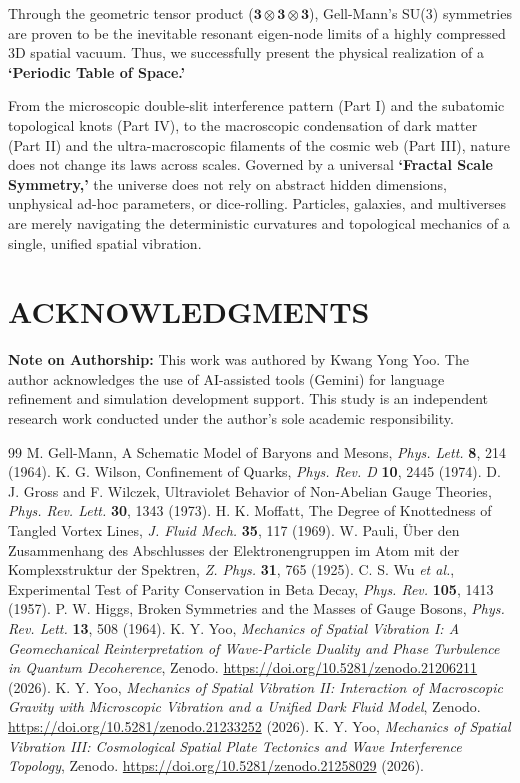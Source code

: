 \documentclass[reprint,amsmath,amssymb,aps,prd]{revtex4-2}
\begin{document}
Through the geometric tensor product ($\mathbf{3} \otimes \mathbf{3} \otimes \mathbf{3}$), Gell-Mann's SU(3) symmetries \cite{GellMann1964} are proven to be the inevitable resonant eigen-node limits of a highly compressed 3D spatial vacuum. Thus, we successfully present the physical realization of a \textbf{`Periodic Table of Space.'}

From the microscopic double-slit interference pattern (Part I) and the subatomic topological knots (Part IV), to the macroscopic condensation of dark matter (Part II) and the ultra-macroscopic filaments of the cosmic web (Part III), nature does not change its laws across scales. Governed by a universal \textbf{`Fractal Scale Symmetry,'} the universe does not rely on abstract hidden dimensions, unphysical ad-hoc parameters, or dice-rolling. Particles, galaxies, and multiverses are merely navigating the deterministic curvatures and topological mechanics of a single, unified spatial vibration.

\vspace{1em}
\section*{ACKNOWLEDGMENTS}
\textbf{Note on Authorship:} This work was authored by Kwang Yong Yoo. The author acknowledges the use of AI-assisted tools (Gemini) for language refinement and simulation development support. This study is an independent research work conducted under the author's sole academic responsibility.

\begin{thebibliography}{99}
 M. Gell-Mann, A Schematic Model of Baryons and Mesons, \textit{Phys. Lett.} \textbf{8}, 214 (1964).
 K. G. Wilson, Confinement of Quarks, \textit{Phys. Rev. D} \textbf{10}, 2445 (1974).
 D. J. Gross and F. Wilczek, Ultraviolet Behavior of Non-Abelian Gauge Theories, \textit{Phys. Rev. Lett.} \textbf{30}, 1343 (1973).
 H. K. Moffatt, The Degree of Knottedness of Tangled Vortex Lines, \textit{J. Fluid Mech.} \textbf{35}, 117 (1969).
 W. Pauli, \"{U}ber den Zusammenhang des Abschlusses der Elektronengruppen im Atom mit der Komplexstruktur der Spektren, \textit{Z. Phys.} \textbf{31}, 765 (1925).
 C. S. Wu \textit{et al.}, Experimental Test of Parity Conservation in Beta Decay, \textit{Phys. Rev.} \textbf{105}, 1413 (1957).
 P. W. Higgs, Broken Symmetries and the Masses of Gauge Bosons, \textit{Phys. Rev. Lett.} \textbf{13}, 508 (1964).
 K. Y. Yoo, \textit{Mechanics of Spatial Vibration I: A Geomechanical Reinterpretation of Wave-Particle Duality and Phase Turbulence in Quantum Decoherence}, Zenodo. \url{https://doi.org/10.5281/zenodo.21206211} (2026).
 K. Y. Yoo, \textit{Mechanics of Spatial Vibration II: Interaction of Macroscopic Gravity with Microscopic Vibration and a Unified Dark Fluid Model}, Zenodo. \url{https://doi.org/10.5281/zenodo.21233252} (2026).
 K. Y. Yoo, \textit{Mechanics of Spatial Vibration III: Cosmological Spatial Plate Tectonics and Wave Interference Topology}, Zenodo. \url{https://doi.org/10.5281/zenodo.21258029} (2026).
\end{thebibliography}
\end{document}
